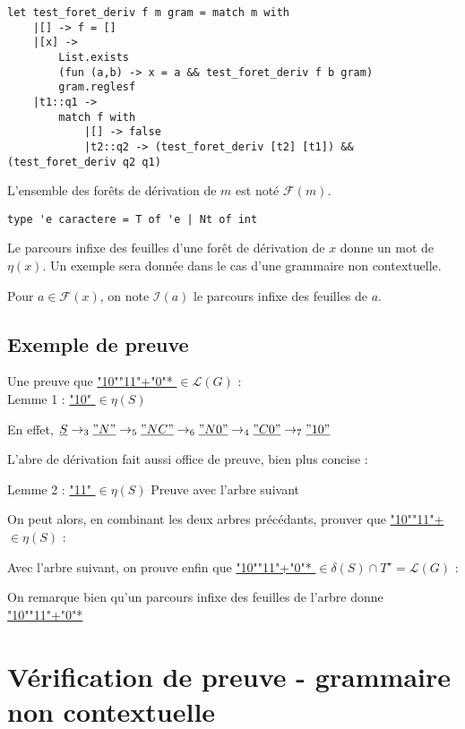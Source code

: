 \documentclass[a4paper,12pt]{article}
\begin{document}
\begin{verbatim}
let test_foret_deriv f m gram = match m with
    |[] -> f = []
    |[x] -> 
        List.exists 
        (fun (a,b) -> x = a && test_foret_deriv f b gram) 
        gram.reglesf
    |t1::q1 -> 
        match f with
            |[] -> false
            |t2::q2 -> (test_foret_deriv [t2] [t1]) && (test_foret_deriv q2 q1)
\end{verbatim}


L'ensemble des forêts de dérivation de $m$ est noté $\mathcal{F}(m)$.

\begin{verbatim}
type 'e caractere = T of 'e | Nt of int
\end{verbatim}

Le parcours infixe des feuilles d'une forêt de dérivation de $x$ donne un mot de $\eta(x)$.
Un exemple sera donnée dans le cas d'une grammaire non contextuelle.

Pour $a \in \mathcal{F}(x)$, on note $\mathcal{I}(a)$ le parcours infixe des feuilles de $a$. 

\subsection{Exemple de preuve}

Une preuve que \underline{ "10""11"+"0"* } $\in \mathcal{L}(G)$ :\\
Lemme 1 : \underline{ "10" } $\in \eta(S)$

    En effet, $\underline{ S }\rightarrow_3 \underline{ "N" } \rightarrow_5 \underline{ "NC" } \rightarrow_6 \underline{ "N0" } \rightarrow_4 \underline{ "C0" } \rightarrow_7 \underline{ "10" }$


L'abre de dérivation fait aussi office de preuve, bien plus concise :
   

Lemme 2 : \underline{ "11" } $\in \eta(S)$
Preuve avec l'arbre suivant
 

On peut alors, en combinant les deux arbres précédants, prouver que \underline{ "10""11"+ } $\in \eta(S)$ :
 

Avec l'arbre suivant, on prouve enfin que \underline{ "10""11"+"0"* } $\in \delta(S) \cap T^\star = \mathcal{L}(G)$ :
 

On remarque bien qu'un parcours infixe des feuilles de l'arbre donne \underline{ "10""11"+"0"* }

\section{Vérification de preuve - grammaire non contextuelle}
\end{document}

